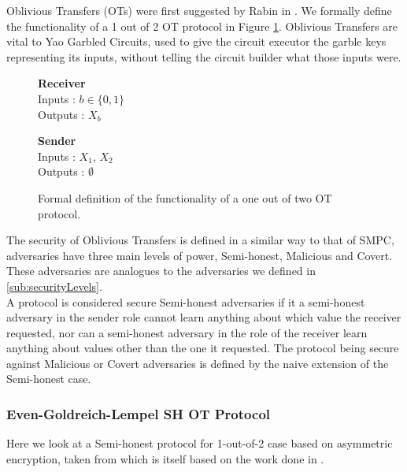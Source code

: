 \documentclass[a4paper,10pt]{article}
\begin{document}
				Oblivious Transfers (OTs) were first suggested by Rabin in \cite{Rabin81}. We formally define the functionality of a 1 out of 2 OT protocol in Figure \ref{fig:OTformalDef}. Oblivious Transfers are vital to Yao Garbled Circuits, used to give the circuit executor the garble keys representing its inputs, without telling the circuit builder what those inputs were.\\

				\begin{figure}[!htb]
					\centering
					\begin{minipage}{0.45\textwidth}
						\centering
						\textbf{Receiver}\\
						Inputs : $b \in \{0, 1\}$\\
						Outputs : $X_b$\\
					\end{minipage}
					\begin{minipage}{0.45\textwidth}
						\centering
						\textbf{Sender}\\
						Inputs : $X_1$, $X_2$\\
						Outputs : $\emptyset$\\
					\end{minipage}
					\caption{ Formal definition of the functionality of a one out of two OT protocol.\label{fig:OTformalDef}}
				\end{figure}
      
				The security of Oblivious Transfers is defined in a similar way to that of SMPC, adversaries have three main levels of power, Semi-honest, Malicious and Covert. These adversaries are analogues to the adversaries we defined in \ref{sub:securityLevels}.\\

				A protocol is considered secure Semi-honest adversaries if it a semi-honest adversary in the sender role cannot learn anything about which value the receiver requested, nor can a semi-honest adversary in the role of the receiver learn anything about values other than the one it requested. The protocol being secure against Malicious or Covert adversaries is defined by the naive extension of the Semi-honest case.
			

			\subsubsection{Even-Goldreich-Lempel SH OT Protocol}
				Here we look at a Semi-honest protocol for 1-out-of-2 case based on asymmetric encryption, taken from \cite{PinkasSlides2014} which is itself based on the work done in \cite{EvenEtAl85}.\\
\end{document}
